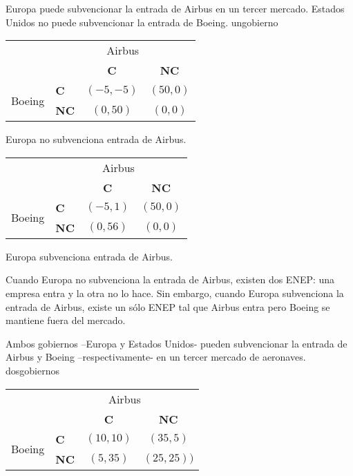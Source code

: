 \documentclass{nuevotema}
\begin{document}
\begin{tabla}{Europa puede subvencionar la entrada de Airbus en un tercer mercado. Estados Unidos no puede subvencionar la entrada de Boeing. }{ungobierno}
	\begin{tabular}{c || l | c | c}
		& \multicolumn{3}{c}{Airbus} \\ 
		& & \textbf{C} & \textbf{NC} \\ \hline \hline
	\multirow{2}{*}{Boeing} &\textbf{C} & $(-5,-5)$ & $(50,0)$  \\ 
		& \textbf{NC} & $(0,50)$ & $(0,0)$ \\ \hline
	\end{tabular} 
\medskip

Europa no subvenciona entrada de Airbus.

\bigskip

	\begin{tabular}{c || l | c | c}
	& \multicolumn{3}{c}{Airbus} \\ 
	& & \textbf{C} & \textbf{NC} \\ \hline \hline
	\multirow{2}{*}{Boeing} &\textbf{C} & $(-5,1)$ & $(50,0)$  \\ 
	& \textbf{NC} & $(0,56)$ & $(0,0)$ \\ \hline
\end{tabular} 
\medskip 

Europa subvenciona entrada de Airbus.
\end{tabla}

Cuando Europa no subvenciona la entrada de Airbus, existen dos ENEP: una empresa entra y la otra no lo hace. Sin embargo, cuando Europa subvenciona la entrada de Airbus, existe un sólo ENEP tal que Airbus entra pero Boeing se mantiene fuera del mercado. 


\begin{tabla}{Ambos gobiernos --Europa y Estados Unidos- pueden subvencionar la entrada de Airbus y Boeing --respectivamente- en un tercer mercado de aeronaves. }{dosgobiernos}
	\begin{tabular}{c || l | c | c}
		& \multicolumn{3}{c}{Airbus} \\ 
		& & \textbf{C} & \textbf{NC} \\ \hline \hline
		\multirow{2}{*}{Boeing} &\textbf{C} & $(10,10)$ & $(35,5)$  \\ 
		& \textbf{NC} & $(5,35)$ & $(25,25))$ \\ \hline
	\end{tabular} 
	\medskip
\end{tabla}
\end{document}
